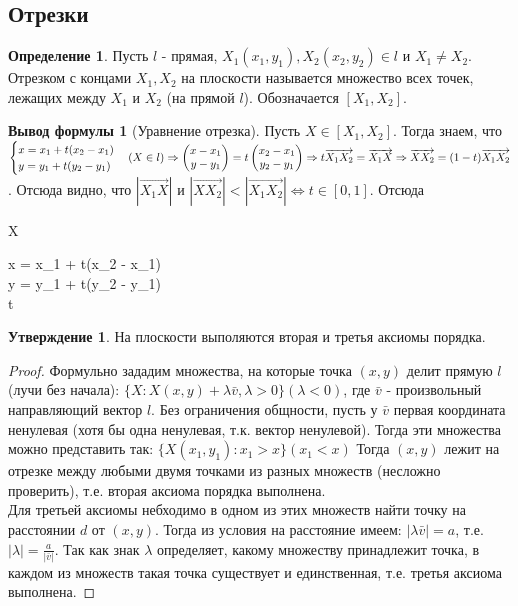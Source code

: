 \documentclass[a4paper, 12pt]{article}
\theoremstyle{definition}
\newtheorem*{definition}{Определение}
\newtheorem*{subtheorem}{Утверждение}
\newtheorem*{formula}{Вывод формулы}
\newenvironment{boxedalign*}
  {\begin{equation*}\begin{lrbox}{\boxedalignbox}$\begin{aligned}}
  {\end{aligned}$\end{lrbox}\fbox{\usebox{\boxedalignbox}}\end{equation*}}
\begin{document}
	\subsection{Отрезки}
	\begin{definition}
		Пусть $l$ - прямая, $X_{1}(x_{1}, y_{1}), X_{2}(x_{2}, y_{2}) \in l$ и $X_{1} \neq X_{2}$. Отрезком с концами $X_{1}, X_{2}$ на плоскости называется множество всех точек, лежащих между $X_{1}$ и $X_{2}$ (на прямой $l$). Обозначается $[X_{1}, X_{2}]$. 
	\end{definition}
	\begin{formula}[Уравнение отрезка]
		Пусть $X \in [X_{1}, X_{2}]$. Тогда знаем, что $\begin{cases}x = x_{1} + t(x_{2} - x_{1}) \\ y = y_{1} + t(y_{2} - y_{1})\end{cases} (X \in l) \Rightarrow \begin{pmatrix} x-x_{1} \\ y-y_{1} \end{pmatrix} = t\begin{pmatrix} x_{2}-x_{1} \\ y_{2}-y_{1} \end{pmatrix} \Rightarrow \\ t\overrightarrow{X_{1}X_{2}} = \overrightarrow{X_{1}X} \Rightarrow \overrightarrow{XX_{2}} = (1-t)\overrightarrow{X_{1}X_{2}}$. Отсюда видно, что $|\overrightarrow{X_{1}X}|$ и $|\overrightarrow{XX_{2}}| < |\overrightarrow{X_{1}X_{2}}| \Leftrightarrow t \in [0, 1]$. Отсюда \begin{boxedalign*}X \in [X_{1}, X_{2}] \Leftrightarrow \begin{cases}x = x_{1} + t(x_{2} - x_{1}) \\ y = y_{1} + t(y_{2} - y_{1})\\t\in [0, 1]\end{cases}\end{boxedalign*}
	\end{formula}
	\begin{subtheorem}
		На плоскости выполяются вторая и третья аксиомы порядка. 
	\end{subtheorem}
	\begin{proof}
		Формульно зададим множества, на которые точка $(x, y)$ делит прямую $l$ (лучи без начала): $\{X: X(x, y)+\lambda \bar{v}, \lambda > 0\} (\lambda < 0)$, где $\bar{v}$ - произвольный направляющий вектор $l$. Без ограничения общности, пусть у $\bar{v}$ первая координата ненулевая (хотя бы одна ненулевая, т.к. вектор ненулевой). Тогда эти множества можно представить так: $\{X(x_{1}, y_{1}): x_{1} > x\} (x_{1} < x)$ Тогда $(x, y)$ лежит на отрезке между любыми двумя точками из разных множеств (несложно проверить), т.е. вторая аксиома порядка выполнена.\\
		Для третьей аксиомы небходимо в одном из этих множеств найти точку на расстоянии $d$ от $(x, y)$. Тогда из условия на расстояние имеем: $|\lambda\bar{v}| = a$, т.е. $|\lambda| = \frac{a}{|\bar{v}|}$. Так как знак $\lambda$ определяет, какому множеству принадлежит точка, в каждом из множеств такая точка существует и единственная, т.е. третья аксиома выполнена.  
	\end{proof}
\end{document}
